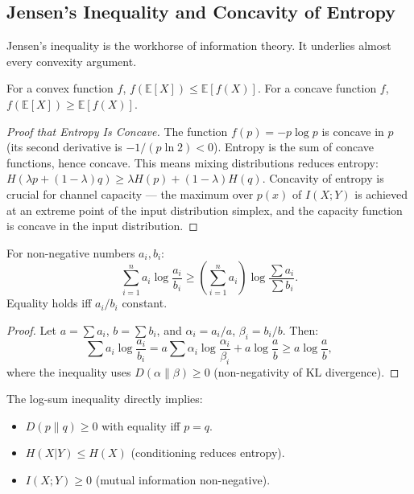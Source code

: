 \subsection{Jensen's Inequality and Concavity of Entropy}
\label{sec:information:jensen}

Jensen's inequality is the workhorse of information theory. It underlies almost every convexity argument.

\begin{theorem}
For a convex function $f$, $f(\mathbb{E}[X]) \le \mathbb{E}[f(X)]$. For a concave function $f$, $f(\mathbb{E}[X]) \ge \mathbb{E}[f(X)]$.
\end{theorem}

\begin{proof}[Proof that Entropy Is Concave]
The function $f(p) = -p\log p$ is concave in $p$ (its second derivative is $-1/(p\ln 2) < 0$). Entropy is the sum of concave functions, hence concave. This means mixing distributions reduces entropy: $H(\lambda p + (1-\lambda)q) \ge \lambda H(p) + (1-\lambda)H(q)$. Concavity of entropy is crucial for channel capacity — the maximum over $p(x)$ of $I(X;Y)$ is achieved at an extreme point of the input distribution simplex, and the capacity function is concave in the input distribution.
\end{proof}

\begin{theorem}
For non-negative numbers $a_i, b_i$:
\[
\sum_{i=1}^n a_i \log \frac{a_i}{b_i} \ge \left(\sum_{i=1}^n a_i\right) \log \frac{\sum a_i}{\sum b_i}.
\]
Equality holds iff $a_i/b_i$ constant.
\end{theorem}

\begin{proof}
Let $a = \sum a_i$, $b = \sum b_i$, and $\alpha_i = a_i/a$, $\beta_i = b_i/b$. Then:
\[
\sum a_i \log\frac{a_i}{b_i} = a\sum\alpha_i\log\frac{\alpha_i}{\beta_i} + a\log\frac{a}{b} \ge a\log\frac{a}{b},
\]
where the inequality uses $D(\alpha\|\beta) \ge 0$ (non-negativity of KL divergence).
\end{proof}

The log-sum inequality directly implies:
\begin{itemize}
\item $D(p\|q) \ge 0$ with equality iff $p=q$.
\item $H(X|Y) \le H(X)$ (conditioning reduces entropy).
\item $I(X;Y) \ge 0$ (mutual information non-negative).
\end{itemize}

